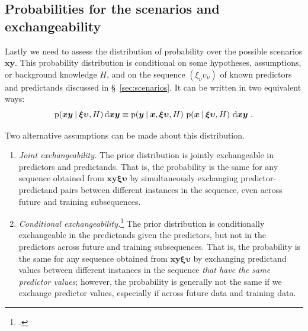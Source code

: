 \documentclass[\ifafour a4paper,12pt,\else a5paper,10pt,\fi%
onecolumn,oneside,article,%
british%
]{memoir}
\theoremstyle{remark}
\theoremstyle{innote}
\newcommand*{\citep}{\footcites}
\newcommand*{\di}{\mathrm{d}}%
\newcommand*{\p}{\mathrm{p}}%
\renewcommand*{\|}[1][]{\nonscript\:#1\vert\nonscript\:\mathopen{}}
\newcommand*{\sect}{\S}%
\newcommand*{\bx}{\bm{x}}
\newcommand*{\by}{\bm{y}}
\newcommand*{\bz}{\bm{xy}}
\newcommand*{\xxx}[1]{\xi_{#1}}
\newcommand*{\yyy}[1]{\upsilon_{#1}}
\newcommand*{\bzz}{\bm{\xi\upsilon}}
\begin{document}
\subsection{Probabilities for the scenarios and exchangeability}
\label{sec:scenario_probabilities}

Lastly we need to assess the distribution of probability over the possible
scenarios $\bz$. This probability distribution is conditional on some
hypotheses, assumptions, or background knowledge $H$, and on the sequence
$(\xxx{\nu}\yyy{\nu})$ of known predictors and predictands discussed in
\sect~\ref{sec:scenarios}. It can be written in two equivalent ways:
\begin{equation}
  \label{eq:prob_distr_conditional}
  \p(\bz \| \bzz, H)\,\di\bz
  \equiv
  \p(\by\| \bx, \bzz, H)\ \p(\bx \| \bzz, H)\ \di\bz \ .
\end{equation}

Two alternative assumptions can be made about this distribution.
\begin{enumerate}[label=(\Roman*),para]
\item\label{item:full_exchangeability} \emph{Joint exchangeability.} The
  prior distribution is jointly exchangeable in predictors and predictands.
  That is, the probability is the same for any sequence obtained from
  $\bz\bzz$ by simultaneously exchanging predictor-predictand pairs between
  different instances in the sequence, even across future and training
  subsequences.
\item\label{item:conditional_exchangeability} \emph{Conditional
    exchangeability.}\citep[\sect~4.6.2]{bernardoetal1994_r2000}[\sect~3]{diaconis1988}[\sect~3,
  Appendix~2]{lindleyetal1981} The prior distribution is conditionally
  exchangeable in the predictands given the predictors, but not in the
  predictors across future and training subsequences. That is, the
  probability is the same for any sequence obtained from $\bz\bzz$ by
  exchanging predictand values between different instances in the sequence
  \emph{that have the same predictor values}; however, the probability is
  generally not the same if we exchange predictor values, especially if
  across future data and training data.
\end{enumerate}
\end{document}
